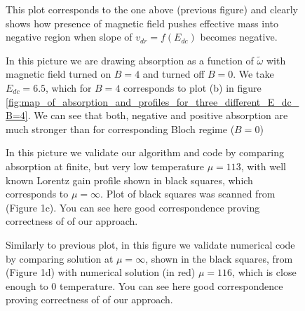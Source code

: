 \documentclass[40pt,letterpaper,physrev]{article}
\begin{document}
	\newpage
	\begin{figure}[H]
	  \centering
	  \normalsize %
	  
	  \label{fig:effect1ive_mass_of_E_dc_different_B}
	  \caption{This plot corresponds to the one above (previous figure) and clearly shows how presence of magnetic field
	  pushes effective mass into negative region when slope of $v_{dr} = f(E_{dc})$ becomes negative.}
	\end{figure}
	\newpage
	\begin{figure}[H]
	  \centering
	  \normalsize %
	  
	  \label{fig:cycl_vs_bloch_gain}
	  \caption{In this picture we are drawing absorption as a function of $\tilde{\omega}$ with magnetic field turned on
	  $B = 4$ and turned off $B = 0$. We take $E_{dc} = 6.5$, which for $B = 4$ corresponds to plot (b) in figure 
	  \ref{fig:map_of_absorption_and_profiles_for_three_different_E_dc_B=4}. We can see that both, negative and 
	  positive absorption are much stronger than for corresponding Bloch regime ($B = 0$)}
	\end{figure}	
	\newpage
	\begin{figure}[H]
	  \centering
	  \normalsize %
	  
	  \label{fig:lorentz_gain}
	  \caption{In this picture we validate our algorithm and code by comparing absorption at finite, but very low 
	  temperature $\mu = 113$, with well known Lorentz gain profile shown in black squares, which corresponds 
	  to $\mu = \infty$. Plot of black squares was scanned from \cite{PhysRevLett.103.117401} (Figure 1c). 
	  You can see here good correspondence proving correctness of of our approach.}
	\end{figure}	
	\begin{figure}[H]
	  \centering
	  \normalsize %
	  
	  \label{fig:gain_at_E_dc=6}
	  \caption{Similarly to previous plot, in this figure we validate numerical code by comparing solution 
	  at $\mu = \infty$, shown in the black squares, from \cite{PhysRevLett.103.117401} (Figure 1d) with 
	  numerical solution (in red) $\mu = 116$, which is close enough to 0 temperature. You can see here good
	  correspondence proving correctness of of our approach.}
	\end{figure}
\end{document}
